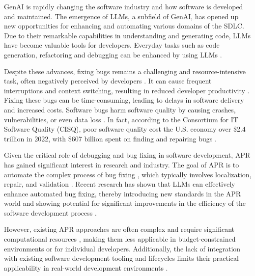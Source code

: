 \Ac{GenAI} is rapidly changing the software industry and how software is developed and maintained. The emergence of \acp{LLM}, a subfield of \ac{GenAI}, has opened up new opportunities for enhancing and automating various domains of the \ac{SDLC}. Due to their remarkable capabilities in understanding and generating code, \acp{LLM} have become valuable tools for developers. Everyday tasks such as code generation, refactoring and debugging can be enhanced by using \acp{LLM} \cite{houLargeLanguageModels2024, puvvadiCodingAgentsComprehensive2025}.

Despite these advances, fixing bugs remains a challenging and resource-intensive task, often negatively perceived by developers \cite{winterHowDevelopersReally2023}. It can cause frequent interruptions and context switching, resulting in reduced developer productivity \cite{vasilescuSkyNotLimit2016}. Fixing these bugs can be time-consuming, leading to delays in software delivery and increased costs. %
Software bugs harm software quality by causing crashes, vulnerabilities, or even data loss \cite{tihanyiNewEraSoftware2024}. In fact, according to the Consortium for IT Software Quality (CISQ), poor software quality cost the U.S. economy over \$2.4 trillion in 2022, with \$607 billion spent on finding and repairing bugs \cite{CostPoorSoftware}.

Given the critical role of debugging and bug fixing in software development, \ac{APR} has gained significant interest in research and industry. The goal of \ac{APR} is to automate the complex process of bug fixing \cite{houLargeLanguageModels2024}, which typically involves localization, repair, and validation \cite{zhangEmpiricalStudyFactors2012, leeUnifiedDebuggingApproach2024, xiaAgentlessDemystifyingLLMbased2024, zhangPATCHEmpoweringLarge2025, wangEmpiricalResearchUtilizing2025}. Recent research has shown that \acp{LLM} can effectively enhance automated bug fixing, thereby introducing new standards in the APR world and showing potential for significant improvements in the efficiency of the software development process \cite{xiaAgentlessDemystifyingLLMbased2024, liuMarsCodeAgentAInative2024, yangSWEagentAgentComputerInterfaces2024, sobaniaAnalysisAutomaticBug2023, xiaAutomatedProgramRepair2024, huCanGPTO1Kill2024}.

However, existing APR approaches are often complex and require significant computational resources \cite{rondonEvaluatingAgentbasedProgram2025}, making them less applicable in budget-constrained environments or for individual developers. Additionally, the lack of integration with existing software development tooling and lifecycles limits their practical applicability in real-world development environments \cite{chenUnveilingPitfallsUnderstanding2025, liuMarsCodeAgentAInative2024}.

